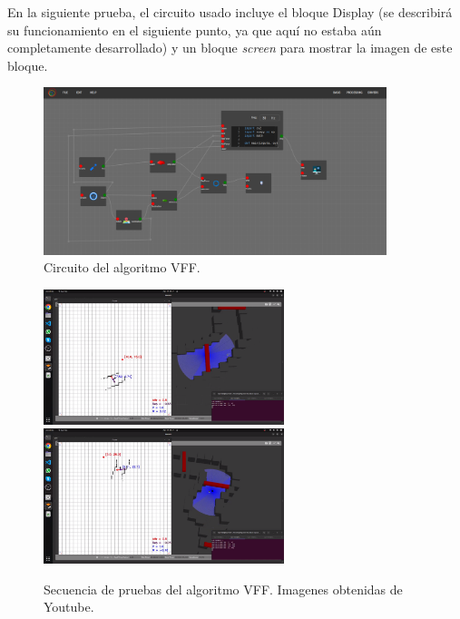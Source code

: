 En la siguiente prueba, el circuito usado incluye el bloque Display (se describirá su funcionamiento en el siguiente punto, ya que aquí no estaba aún
completamente desarrollado) y un bloque \textit{screen} para mostrar la imagen de este bloque.

\begin{figure} [H]
    \begin{center}
        \includegraphics[width=10cm]{figs/c6/VFF_disp_circ.png}
    \end{center}
    \caption[Circuito VFF]{Circuito del algoritmo VFF.}
    \label{fig:VFF_disp_circ}
\end{figure}

\begin{figure} [H]
    \begin{center}
        \includegraphics[width=7cm]{figs/c6/VFF_d1.png}
        \includegraphics[width=7cm]{figs/c6/VFF_d2.png}
    \end{center}
    \caption[Secuencia prueba VFF]{Secuencia de pruebas del algoritmo VFF. Imagenes obtenidas de Youtube\footnotemark.}
    \label{fig:VFF_pruebas}
\end{figure}

